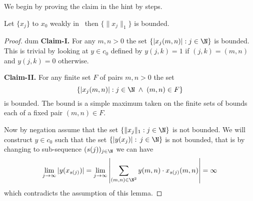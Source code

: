 We begin by proving the claim in the hint by steps.

\begin{llem}
Let \(\{x_j\}\) to \(x_0\) weakly in \ellone\ then
  \(\{\|x_j\|_1\}\) is bounded.
\end{llem}
\begin{proof}
{\nullfont dum}
\newline
\textbf{Claim-I.}
For any \(m,n>0\) the set \(\{|x_j(m,n)|: j\in\N\}\)  is bounded.
This is trivial by looking at \(y\in c_0\) defined by \(y(j,k)=1\)
if \((j,k)=(m,n)\) and \(y(j,k)=0\) otherwise.

\textbf{Claim-II.}
For any finite set $F$ of pairs 
\(m,n>0\) the set 
\begin{equation*}
\{|x_j(m,n)|: j\in\N\;\land\; (m,n)\in F\}
\end{equation*}
is bounded.
\newline
The bound is a simple maximum taken on the finite sets of 
bounds each of a fixed pair \((m,n)\in F\).

Now by negation assume that the set  \(\{\|x_j\|_1:j\in\N\}\) is not bounded.
We will construct \(y\in c_0\) such that the set
\(\{|y(x_j)|:\,j\in\N\}\) is not bounded, that is by changing to 
sub-sequence \((s(j))_{j\in\N}\) we can have
\begin{equation*}
\lim_{j\to\infty}|y(x_{s(j)})| 
 = \lim_{j\to\infty} \left| \sum_{(m,n)\in\N^2} y(m,n)\cdot x_{s(j)}(m,n) \right| 
 = \infty
\end{equation*}
which contradicts the assumption of this lemma.


\end{proof}
